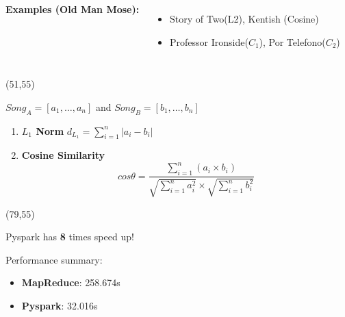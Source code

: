 \documentclass[hyperref={pdfpagelabels=false}]{beamer}
\begin{document}
\begin{frame}
\begin{textblock}{48}
\begin{basebox}[frogbox,title=Big Data Recommendation, opacitybacktitle=.45,colframe=grey!65!black,colbacktitle=green!10, halign title=left]
\begin{columns}

    \textbf{Examples (Old Man Mose): }
    \begin{itemize}
        \item Story of Two(L2), Kentish (Cosine)
        \item Professor Ironside($C_1$), Por Telefono($C_2$)
    \end{itemize}
    
\end{columns}

    


	\end{basebox}

 
\end{textblock}

\begin{textblock}{26}(51,55)
	\begin{basebox}[title=Similarity Metrics, opacitybacktitle=.45,colbacktitle=green!10, colframe=grey!65!black, halign title=left]
        $Song_A = [a_1, \dots, a_n]$ and $Song_B = [b_1, \dots, b_n]$

        \begin{enumerate}
             \item \textbf{{$L_1$ Norm}}   $d_{L_1} = \sum_{i=1}^{n} |a_i - b_i|$
             \item \textbf{Cosine Similarity }
            $$
                cos\theta = \frac{\sum_{i=1}^{n} (a_i \times b_i)}{\sqrt{\sum_{i=1}^n a_i^2} \times \sqrt{\sum_{i=1}^n b_i^2}}
            $$
\end{enumerate}
	\end{basebox}
\end{textblock}


\begin{textblock}{20}(79,55)
	\begin{basebox}[title=MapReduce v.s. Pyspark, opacitybacktitle=.45,colbacktitle=green!10, colframe=grey!65!black, halign title=left]

        Pyspark has \textbf{\Huge 8} times speed up!\par
        \vspace{0.5em}
        Performance summary:
        \vspace{0.5em}
        \begin{itemize}
            \item \textbf{MapReduce}: 258.674s
            \item \textbf{Pyspark}: 32.016s
        \end{itemize}
        \vspace{0.3em}
	\end{basebox}
\end{textblock}



\end{frame}
\end{document}
